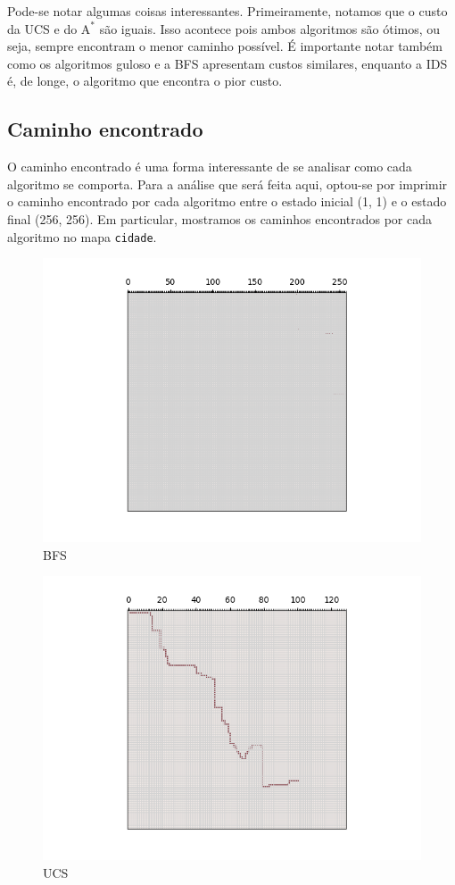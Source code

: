 \documentclass{article}
\begin{document}
Pode-se notar algumas coisas interessantes. Primeiramente, notamos que o custo da UCS e do \(\text{A}^*\) são iguais. Isso acontece pois ambos algoritmos são ótimos, ou seja, sempre encontram o menor caminho possível.
É importante notar também como os algoritmos guloso e a BFS apresentam custos similares, enquanto a IDS é, de longe,
o algoritmo que encontra o pior custo.

\subsection{Caminho encontrado}

O caminho encontrado é uma forma interessante de se analisar como cada algoritmo se comporta. Para a análise que será feita aqui, optou-se por imprimir o caminho encontrado por cada algoritmo entre o estado inicial
(1, 1) e o estado final (256, 256). Em particular, mostramos os caminhos encontrados por cada algoritmo no mapa \texttt{cidade}.

\begin{figure}[H]
	\centering
	\includegraphics[width=1.0\textwidth]{../images/paths/BFS.png}
	\caption{BFS}
\end{figure}

\begin{figure}[H]
	\centering
	\includegraphics[width=1.0\textwidth]{../images/paths/UCS.png}
	\caption{UCS}
\end{figure}
\end{document}
